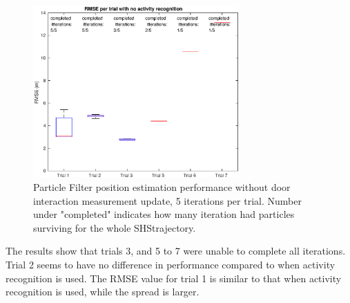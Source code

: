 \begin{figure}[H]
	\centering
	\includegraphics[width=0.7\textwidth]{images/20201118_1507_RMSE_per_trial_with_no_activity_recognition}
	\caption[Particle Filter position estimation performance without door interaction]{Particle Filter position estimation performance without door interaction measurement update, 5 iterations per trial. Number under "completed" indicates how many iteration had particles surviving for the whole \ac{SHS}trajectory.}
	\label{fig:pf_boxplot_no_doors}
\end{figure}

The results show that trials 3, and 5 to 7 were unable to complete all iterations. Trial 2 seems to have no difference in performance compared to when activity recognition is used. The RMSE value for trial 1 is similar to that when activity recognition is used, while the spread is larger.

